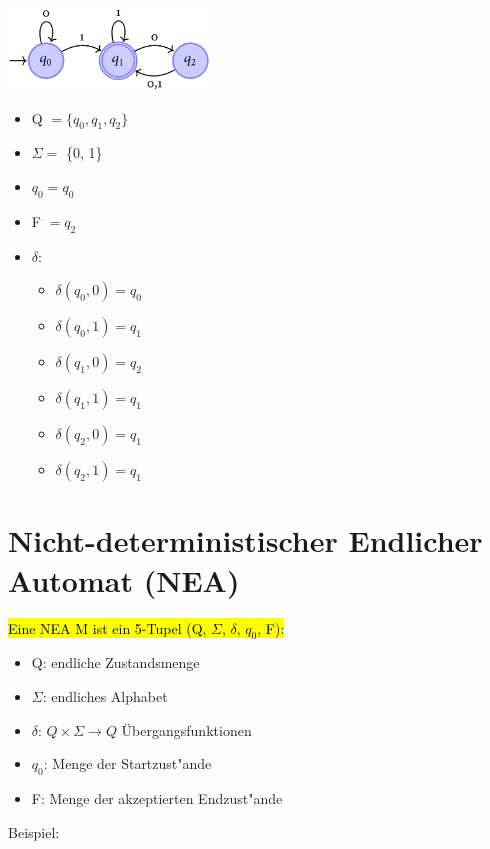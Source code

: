 \documentclass[11pt, a4paper]{scrartcl}
\begin{document}
\includegraphics[width=0.4\textwidth]{DEA-00.png}

\begin{itemize}
    \item Q $= \{q_0, q_1, q_2\}$
    \item $\Sigma =$ \{0, 1\}
    \item $q_0 = q_0$
    \item F $= q_2$
    \item $\delta$:
    \begin{itemize}[label={}]
        \item $\delta(q_0, 0) = q_0$
        \item $\delta(q_0, 1) = q_1$
        \item $\delta(q_1, 0) = q_2$
        \item $\delta(q_1, 1) = q_1$
        \item $\delta(q_2, 0) = q_1$
        \item $\delta(q_2, 1) = q_1$
      \end{itemize}
\end{itemize}

\newpage

\section{Nicht-deterministischer Endlicher Automat (NEA)}

\hl{Eine NEA M ist ein 5-Tupel (Q, $\Sigma$, $\delta$, $q_0$, F):}

\begin{itemize}
    \item Q: endliche Zustandsmenge
    \item $\Sigma$: endliches Alphabet
    \item $\delta$: $Q \times \Sigma \rightarrow Q$ Übergangsfunktionen
    \item $q_0$: Menge der Startzust"ande
    \item F: Menge der akzeptierten Endzust"ande
\end{itemize}

\vspace{2em}
Beispiel:
\vspace{1em}
\end{document}
